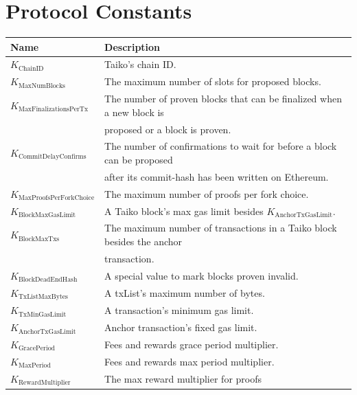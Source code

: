 \documentclass[9pt,oneside]{amsart}
\begin{document}
\section{Protocol Constants}\label{sec:constants1}

\begin{tabu}{l l}
\toprule
Name  & Description \\
\midrule
$K_{\mathrm{ChainID}}$ & Taiko's chain ID. \\
$K_{\mathrm{MaxNumBlocks}}$ & The maximum number of slots for proposed blocks. \\
$K_{\mathrm{MaxFinalizationsPerTx}}$  & The number of proven blocks that can be finalized when a new block is\\
& proposed or a block is proven. \\
$K_{\mathrm{CommitDelayConfirms}}$  & The number of confirmations to wait for before a block can be proposed\\
& after its commit-hash has been written on Ethereum.\\
$K_{\mathrm{MaxProofsPerForkChoice}}$ & The maximum number of proofs per fork choice. \\
$K_{\mathrm{BlockMaxGasLimit}}$  & A Taiko block's max gas limit besides $K_{\mathrm{AnchorTxGasLimit}}$.  \\
$K_{\mathrm{BlockMaxTxs}}$  & The maximum number of transactions in a Taiko block besides the anchor\\
&  transaction. \\
$K_{\mathrm{BlockDeadEndHash}}$ & A special value to mark blocks proven invalid. \\
$K_{\mathrm{TxListMaxBytes}}$  & A txList's maximum number of bytes. \\
$K_{\mathrm{TxMinGasLimit}}$  & A transaction's minimum gas limit. \\
$K_{\mathrm{AnchorTxGasLimit}}$  & Anchor transaction's fixed gas limit. \\
$K_{\mathrm{GracePeriod}}$  & Fees and rewards grace period multiplier. \\
$K_{\mathrm{MaxPeriod}}$ & Fees and rewards max period multiplier. \\
$K_{\mathrm{RewardMultiplier}}$ & The max reward multiplier for proofs \\
\bottomrule
\end{tabu}
\end{document}

